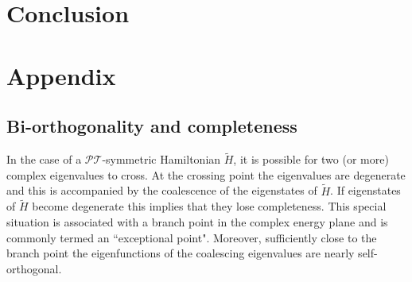 \documentclass[12pt, a4paper]{report}
\newenvironment{Figure}
    {\par\medskip\noindent\minipage{\linewidth}}
    {\endminipage\par\medskip}
\newcommand\PT{\(\mathcal{PT}\)}
\begin{document}







\chapter{Conclusion}\label{Conclusion}





%


\chapter{Appendix}\label{appendix}

\section*{Bi-orthogonality and completeness}\label{}
In the case of a \PT-symmetric Hamiltonian $\tilde{H}$, it is possible for two (or more) complex eigenvalues to cross. At the crossing point the eigenvalues are degenerate and this is accompanied by the coalescence of the eigenstates of $\tilde{H}$. If eigenstates of $\tilde{H}$ become degenerate this implies that they lose completeness\cite{Brody_2013}. This special situation is associated with a branch point in the complex energy plane and is commonly termed an ``exceptional point"\cite{Moiseyev}. Moreover, sufficiently close to the branch point the eigenfunctions of the coalescing eigenvalues are nearly self-orthogonal.
\end{document}
